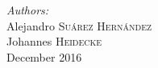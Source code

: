 \begin{titlepage}
\Large \emph{Authors:}\\
Alejandro \textsc{Suárez Hernández}\\ %
Johannes \textsc{Heidecke}\\[3cm] %


{\large December 2016}\\[3cm] %


 

\vspace*{\fill} %

\end{titlepage}
